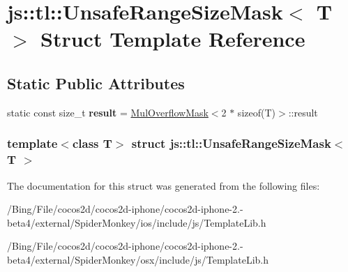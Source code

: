 \hypertarget{structjs_1_1tl_1_1_unsafe_range_size_mask}{\section{js\-:\-:tl\-:\-:Unsafe\-Range\-Size\-Mask$<$ T $>$ Struct Template Reference}
\label{structjs_1_1tl_1_1_unsafe_range_size_mask}
}
\subsection*{Static Public Attributes}
\begin{DoxyCompactItemize}
\item 
\hypertarget{structjs_1_1tl_1_1_unsafe_range_size_mask_af44f9c6459f986ae1459c141c5aba081}{static const size\-\_\-t {\bfseries result} = \hyperlink{structjs_1_1tl_1_1_mul_overflow_mask}{Mul\-Overflow\-Mask}$<$2 $\ast$ sizeof(T)$>$\-::result}\label{structjs_1_1tl_1_1_unsafe_range_size_mask_af44f9c6459f986ae1459c141c5aba081}

\end{DoxyCompactItemize}
\subsubsection*{template$<$class T$>$ struct js\-::tl\-::\-Unsafe\-Range\-Size\-Mask$<$ T $>$}



The documentation for this struct was generated from the following files\-:\begin{DoxyCompactItemize}
\item 
/\-Bing/\-File/cocos2d/cocos2d-\/iphone/cocos2d-\/iphone-\/2.-\/beta4/external/\-Spider\-Monkey/ios/include/js/Template\-Lib.\-h\item 
/\-Bing/\-File/cocos2d/cocos2d-\/iphone/cocos2d-\/iphone-\/2.-\/beta4/external/\-Spider\-Monkey/osx/include/js/Template\-Lib.\-h\end{DoxyCompactItemize}
